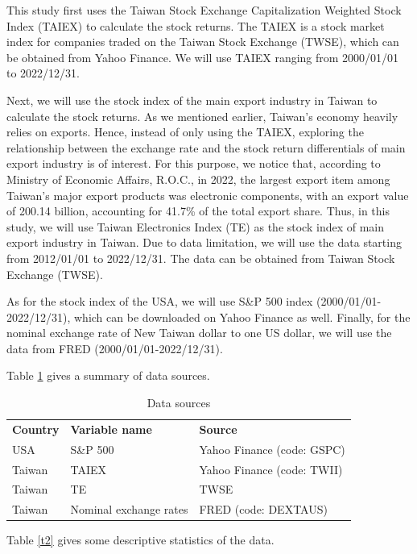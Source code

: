 \documentclass[]{AEA}
\begin{document}
\begin{spacing}{2.0}
This study first uses the Taiwan Stock Exchange Capitalization Weighted Stock Index (TAIEX) to calculate the stock returns. The TAIEX is a stock market index for companies traded on the Taiwan Stock Exchange (TWSE), which can be obtained from Yahoo Finance. We will use TAIEX ranging from 2000/01/01 to 2022/12/31.

Next, we will use the stock index of the main export industry in Taiwan to calculate the stock returns. As we mentioned earlier, Taiwan's economy heavily relies on exports. Hence, instead of only using the TAIEX, exploring the relationship between the exchange rate and the stock return differentials of main export industry is of interest. For this purpose, we notice that, according to Ministry of Economic Affairs, R.O.C., in 2022, the largest export item among Taiwan's major export products was electronic components, with an export value of 200.14 billion, accounting for 41.7\% of the total export share. Thus, in this study, we will use Taiwan Electronics Index (TE) as the stock index of main export industry in Taiwan. Due to data limitation, we will use the data starting from 2012/01/01 to 2022/12/31. The data can be obtained from Taiwan Stock Exchange (TWSE). 

As for the stock index of the USA, we will use S\&P 500 index (2000/01/01-2022/12/31), which can be downloaded on Yahoo Finance as well. Finally, for the nominal exchange rate of New Taiwan dollar to one US dollar, we will use the data from FRED (2000/01/01-2022/12/31).

Table \ref{t1} gives a summary of data sources.

\begin{table}
\caption{Data sources}
\label{t1}
\begin{tabular}{lll}
\textbf{Country} & \textbf{Variable name} & \textbf{Source} \\
USA & S\&P 500 & Yahoo Finance (code: GSPC) \\
Taiwan & TAIEX & Yahoo Finance (code: TWII) \\
Taiwan & TE & TWSE \\
Taiwan & Nominal exchange rates & FRED (code: DEXTAUS)\\
\end{tabular}
\end{table}


Table \ref{t2} gives some descriptive statistics of the data.


\end{spacing}
\end{document}
